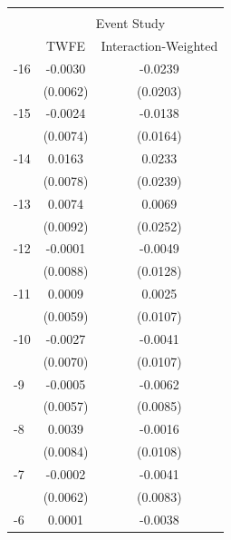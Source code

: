 \begin{tabular}{l*{2}{c}} 
\\[-1.8ex]\hline \hline \\[-1.8ex] 
& \multicolumn{2}{c}{Event Study} \\ \midrule
                    &\multicolumn{1}{c}{TWFE}&\multicolumn{1}{c}{Interaction-Weighted}\\
\midrule
-16                 &     -0.0030         &     -0.0239         \\
                    &    (0.0062)         &    (0.0203)         \\
-15                 &     -0.0024         &     -0.0138         \\
                    &    (0.0074)         &    (0.0164)         \\
-14                 &      0.0163\sym{**} &      0.0233         \\
                    &    (0.0078)         &    (0.0239)         \\
-13                 &      0.0074         &      0.0069         \\
                    &    (0.0092)         &    (0.0252)         \\
-12                 &     -0.0001         &     -0.0049         \\
                    &    (0.0088)         &    (0.0128)         \\
-11                 &      0.0009         &      0.0025         \\
                    &    (0.0059)         &    (0.0107)         \\
-10                 &     -0.0027         &     -0.0041         \\
                    &    (0.0070)         &    (0.0107)         \\
-9                  &     -0.0005         &     -0.0062         \\
                    &    (0.0057)         &    (0.0085)         \\
-8                  &      0.0039         &     -0.0016         \\
                    &    (0.0084)         &    (0.0108)         \\
-7                  &     -0.0002         &     -0.0041         \\
                    &    (0.0062)         &    (0.0083)         \\
-6                  &      0.0001         &     -0.0038         \\

\end{tabular}
